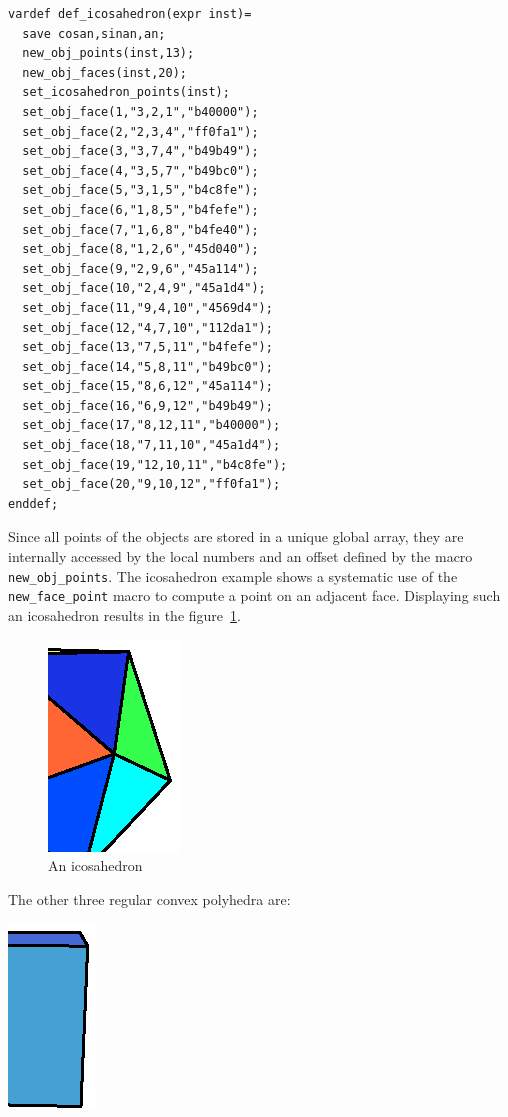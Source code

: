\documentclass[nonumber,harvardcite]{ltugboat}
\begin{document}
\begin{verbatim}
vardef def_icosahedron(expr inst)=
  save cosan,sinan,an;
  new_obj_points(inst,13);
  new_obj_faces(inst,20);
  set_icosahedron_points(inst);
  set_obj_face(1,"3,2,1","b40000");
  set_obj_face(2,"2,3,4","ff0fa1");
  set_obj_face(3,"3,7,4","b49b49");
  set_obj_face(4,"3,5,7","b49bc0");
  set_obj_face(5,"3,1,5","b4c8fe");
  set_obj_face(6,"1,8,5","b4fefe");
  set_obj_face(7,"1,6,8","b4fe40");
  set_obj_face(8,"1,2,6","45d040");
  set_obj_face(9,"2,9,6","45a114");
  set_obj_face(10,"2,4,9","45a1d4");
  set_obj_face(11,"9,4,10","4569d4");
  set_obj_face(12,"4,7,10","112da1");
  set_obj_face(13,"7,5,11","b4fefe");
  set_obj_face(14,"5,8,11","b49bc0");
  set_obj_face(15,"8,6,12","45a114");
  set_obj_face(16,"6,9,12","b49b49");
  set_obj_face(17,"8,12,11","b40000");
  set_obj_face(18,"7,11,10","45a1d4");
  set_obj_face(19,"12,10,11","b4c8fe");
  set_obj_face(20,"9,10,12","ff0fa1");
enddef;
\end{verbatim}

Since all points of the objects are stored in a unique global array,
they are internally 
accessed by the local numbers and an offset defined by the 
macro \verb|new_obj_points|.
The icosahedron example shows a systematic use of the
\verb|new_face_point| macro to compute a point on an adjacent face.
Displaying such an icosahedron results in the figure~\ref{icosahedron}.
\begin{figure}[h]
\begin{center}
\includegraphics{icosa.ps}
\end{center}
\caption{An icosahedron}\label{icosahedron}
\end{figure}

The other three regular convex polyhedra are:
\begin{center}
\includegraphics{cube.ps}
\end{center}
\end{document}

